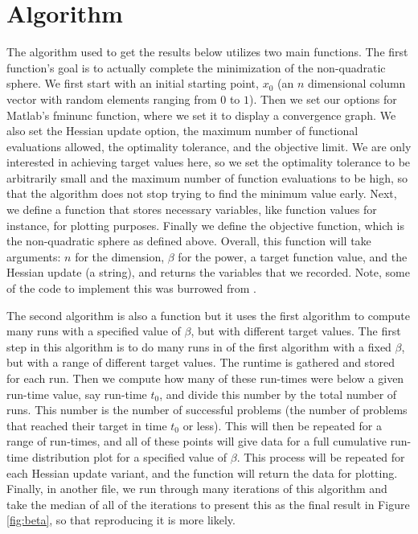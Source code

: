 \documentclass[sigconf, 7pt]{acmart}
\begin{document}
\section{Algorithm}
\label{algorithm}
The algorithm used to get the results below utilizes two main functions. The first function's goal is to actually complete the minimization of the non-quadratic sphere. We first start with an initial starting point, $x_0$ (an $n$ dimensional column vector with random elements ranging from $0$ to $1$). Then we set our options for Matlab's fminunc function, where we set it to display a convergence graph. We also set the Hessian update option, the maximum number of functional evaluations allowed, the optimality tolerance, and the objective limit. We are only interested in achieving target values here, so we set the optimality tolerance to be arbitrarily small and the maximum number of function evaluations to be high, so that the algorithm does not stop trying to find the minimum value early. Next, we define a function that stores necessary variables, like function values for instance, for plotting purposes. Finally we define the objective function, which is the non-quadratic sphere as defined above. Overall, this function will take arguments: $n$ for the dimension, $\beta$ for the power, a target function value, and the Hessian update (a string), and returns the variables that we recorded. Note, some of the code to implement this was burrowed from \cite{MathWorks}.

The second algorithm is also a function but it uses the first algorithm to compute many runs with a specified value of $\beta$, but with different target values. The first step in this algorithm is to do many runs in of the first algorithm with a fixed $\beta$, but with a range of different target values. The runtime is gathered and stored for each run. Then we compute how many of these run-times were below a given run-time value, say run-time $t_0$, and divide this number by the total number of runs. This number is the number of successful problems (the number of problems that reached their target in time $t_0$ or less). This will then be repeated for a range of run-times, and all of these points will give data for a full cumulative run-time distribution plot for a specified value of $\beta$. This process will be repeated for each Hessian update variant, and the function will return the data for plotting. Finally, in another file, we run through many iterations of this algorithm and take the median of all of the iterations to present this as the final result in Figure \ref{fig:beta}, so that reproducing it is more likely.
\end{document}
